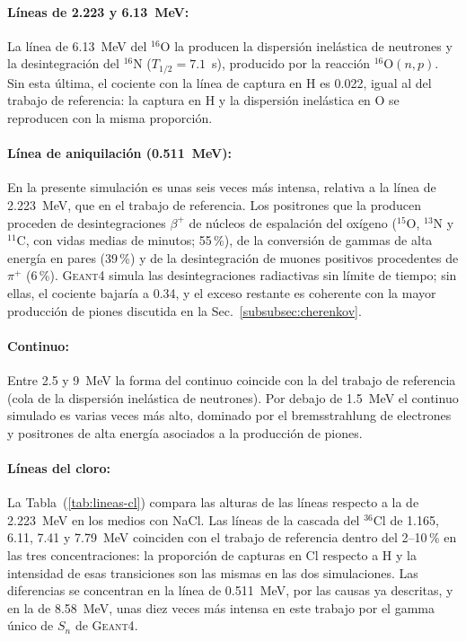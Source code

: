 \paragraph{Líneas de 2.223 y 6.13~MeV:} La línea de 6.13~MeV del $^{16}$O la producen la dispersión inelástica de neutrones y la desintegración del $^{16}$N ($T_{1/2}=7.1$~s), producido por la reacción $^{16}\mathrm{O}(n,p)$. Sin esta última, el cociente con la línea de captura en H es 0.022, igual al del trabajo de referencia: la captura en H y la dispersión inelástica en O se reproducen con la misma proporción.

\paragraph{Línea de aniquilación (0.511~MeV):} En la presente simulación es unas seis veces más intensa, relativa a la línea de 2.223~MeV, que en el trabajo de referencia. Los positrones que la producen proceden de desintegraciones $\beta^{+}$ de núcleos de espalación del oxígeno ($^{15}$O, $^{13}$N y $^{11}$C, con vidas medias de minutos; 55\,\%), de la conversión de gammas de alta energía en pares (39\,\%) y de la desintegración de muones positivos procedentes de $\pi^{+}$ (6\,\%). \textsc{Geant4} simula las desintegraciones radiactivas sin límite de tiempo; sin ellas, el cociente bajaría a 0.34, y el exceso restante es coherente con la mayor producción de piones discutida en la Sec.~\ref{subsubsec:cherenkov}.

\paragraph{Continuo:} Entre 2.5 y 9~MeV la forma del continuo coincide con la del trabajo de referencia (cola de la dispersión inelástica de neutrones). Por debajo de 1.5~MeV el continuo simulado es varias veces más alto, dominado por el bremsstrahlung de electrones y positrones de alta energía asociados a la producción de piones.

\paragraph{Líneas del cloro:} La Tabla~(\ref{tab:lineas-cl}) compara las alturas de las líneas respecto a la de 2.223~MeV en los medios con NaCl. Las líneas de la cascada del $^{36}$Cl de 1.165, 6.11, 7.41 y 7.79~MeV coinciden con el trabajo de referencia dentro del 2--10\,\% en las tres concentraciones: la proporción de capturas en Cl respecto a H y la intensidad de esas transiciones son las mismas en las dos simulaciones. Las diferencias se concentran en la línea de 0.511~MeV, por las causas ya descritas, y en la de 8.58~MeV, unas diez veces más intensa en este trabajo por el gamma único de $S_n$ de \textsc{Geant4}.

